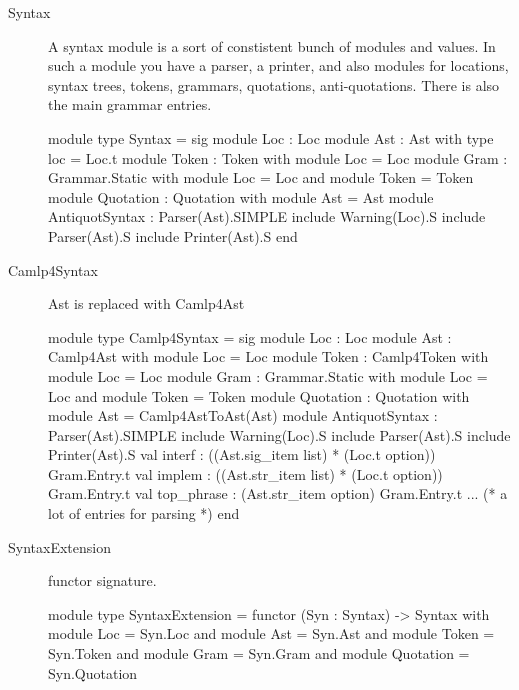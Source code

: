 \begin{description}
\item[Syntax] A syntax module is a sort of constistent bunch of
  modules and values.  In such a module you have a parser, a printer,
  and also modules for locations, syntax trees, tokens, grammars,
  quotations, anti-quotations.  There is also the main grammar
  entries.

\begin{ocamlcode}
  module type Syntax =  sig
    module Loc : Loc
    module Ast : Ast with type loc = Loc.t
    module Token : Token with module Loc = Loc
    module Gram : Grammar.Static with module Loc = Loc
      and module Token = Token
    module Quotation : Quotation with module Ast = Ast
    module AntiquotSyntax : Parser(Ast).SIMPLE
    include Warning(Loc).S
    include Parser(Ast).S
    include Printer(Ast).S
  end
\end{ocamlcode}
  
\item[Camlp4Syntax] Ast is replaced with Camlp4Ast

\begin{ocamlcode}
module type Camlp4Syntax = sig
    module Loc : Loc
    module Ast : Camlp4Ast with module Loc = Loc
    module Token : Camlp4Token with module Loc = Loc
    module Gram : Grammar.Static with module Loc = Loc
      and module Token = Token
    module Quotation : Quotation with module Ast = Camlp4AstToAst(Ast)
    module AntiquotSyntax : Parser(Ast).SIMPLE
    include Warning(Loc).S
    include Parser(Ast).S
    include Printer(Ast).S
    val interf : ((Ast.sig_item list) * (Loc.t option)) Gram.Entry.t
    val implem : ((Ast.str_item list) * (Loc.t option)) Gram.Entry.t
    val top_phrase : (Ast.str_item option) Gram.Entry.t
    ... (* a lot of entries for parsing *)
 end 
\end{ocamlcode}
  
\item[SyntaxExtension] functor signature.

\begin{ocamlcode}
module type SyntaxExtension =
  functor (Syn : Syntax) -> Syntax with module Loc = Syn.Loc
    and module Ast = Syn.Ast and module Token = Syn.Token
    and module Gram = Syn.Gram and module Quotation = Syn.Quotation  
\end{ocamlcode}
  
\end{description}

